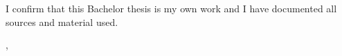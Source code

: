 \thispagestyle{empty}
\vspace*{0.8\textheight}
\noindent
I confirm that this Bachelor thesis is my own work and I have documented all sources and material used.

\vspace{15mm}
\noindent
\getSubmissionLocation{}, \getSubmissionDate{} \hspace{\fill} \getAuthor{}

\cleardoublepage{}
